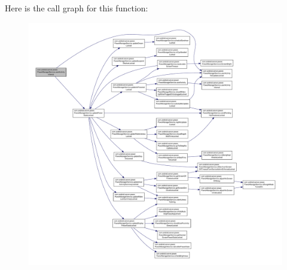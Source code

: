 Here is the call graph for this function\-:
\nopagebreak
\begin{figure}[H]
\begin{center}
\leavevmode
\includegraphics[width=350pt]{classcom_1_1android_1_1server_1_1power_1_1PowerManagerService_a6905de30775b56c1ab51c9a1b868d168_cgraph}
\end{center}
\end{figure}


